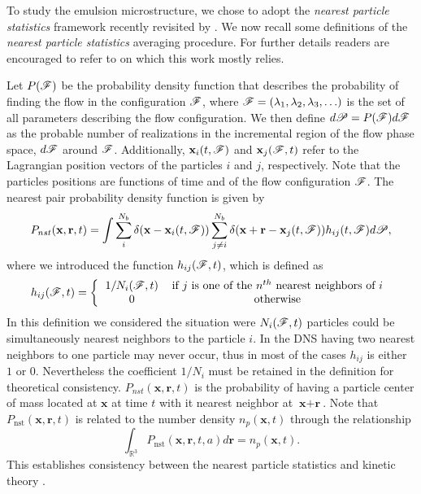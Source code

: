 
To study the emulsion microstructure, we chose to adopt the \textit{nearest particle statistics} framework recently revisited by \citet{zhang2021ensemble}.
We now recall some definitions of the \textit{nearest particle statistics} averaging procedure. 
For further details readers are encouraged to refer to \citet{zhang2023evolution} on which this work mostly relies.

Let $P(\mathscr{F})$ be the probability density function that describes the probability of finding the flow in the configuration $\mathscr{F}$, where $\mathscr{F} = (\lambda_1,\lambda_2,\lambda_3,\ldots)$ is the set of all parameters describing the flow configuration.
We then define $d\mathscr{P} = P(\mathscr{F})d\mathscr{F}$ as the probable number of realizations in the incremental region of the flow phase space, $d\mathscr{F}$ around $\mathscr{F}$.
Additionally,  $\textbf{x}_i(t,\mathscr{F})$ and $\textbf{x}_j(\mathscr{F},t)$ refer to the Lagrangian position vectors of the particles $i$ and $j$, respectively. 
Note that the particles positions are functions of time and of the flow configuration $\mathscr{F}$. 
The nearest pair probability density function is given by \citep{zhang2021ensemble,zhang2023evolution}
\begin{equation}
    P_{nst}(\textbf{x},\textbf{r},t)= 
    \int \sum_{i}^{N_b}\delta(\textbf{x}-\textbf{x}_i(t,\mathscr{F}))
    \sum_{j\neq i}^{N_b}\delta(\textbf{x}+\textbf{r}-\textbf{x}_j(t,\mathscr{F})) 
    h_{ij} (t,\mathscr{F})
    d\mathscr{P},
    \label{eq:P_nstij}
\end{equation}
where we introduced the function $h_{ij}(\mathscr{F},t)$, which is defined as
\begin{equation*}
    h_{ij}(\FF,t)
    = \left\{
        \begin{tabular}{cc}
            $1/N_i(\FF,t)$ & if $j$ is one of the $n^{th}$ nearest neighbors of $i$ \\
            0& otherwise
        \end{tabular}
        \right.
\end{equation*}
In this definition we considered the situation were $N_i(\mathscr{F},t)$ particles could be simultaneously nearest neighbors to the particle $i$. 
In the DNS having two nearest neighbors to one particle may never occur, thus in most of the cases $h_{ij}$ is either $1$ or $0$. 
Nevertheless the coefficient $1/N_i$ must be retained in the definition for theoretical consistency.
$P_{nst}(\textbf{x},\textbf{r},t)$ is the probability of having a particle center of mass located at $\textbf{x}$ at time $t$ with it nearest neighbor at $\textbf{x}+\textbf{r}$. 
Note that $P_\text{nst}(\textbf{x},\textbf{r},t)$ is related to the number density $n_p(\textbf{x},t)$ through the relationship
\begin{equation*}
    \int_{\mathbb{R}^3}
     P_\text{nst}(\textbf{x},\textbf{r},t,a) d\textbf{r}  = n_p(\textbf{x},t). 
    \label{eq:Pnst}
\end{equation*}
This establishes consistency between the nearest particle statistics and kinetic theory \citep{zhang2021ensemble}. 


